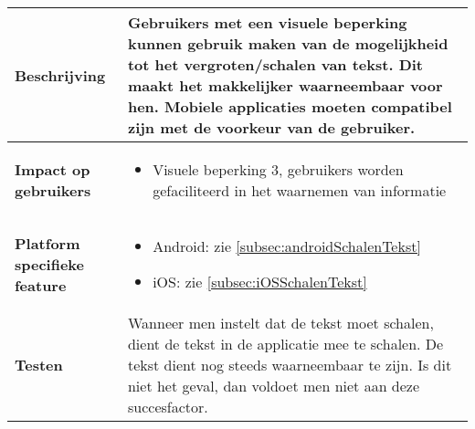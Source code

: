 \begin{table}[H]
\begin{tabular}{|l|p{12cm}|}
        \hline
        \textbf{Beschrijving}                 & Gebruikers met een visuele beperking kunnen gebruik maken van de mogelijkheid tot het vergroten/schalen van tekst. Dit maakt het makkelijker waarneembaar voor hen. Mobiele applicaties moeten compatibel zijn met de voorkeur van de gebruiker.\\ 
        \hline
        \textbf{Impact op gebruikers}         &  
        \begin{itemize}
            \item Visuele beperking 3, gebruikers worden gefaciliteerd in het waarnemen van informatie
        \end{itemize}                                                                                                                                                                                                                                                                                                                                                                                                                    \\ 
        \hline
        \textbf{Platform specifieke feature}  & \begin{itemize}
            \item Android: zie \ref{subsec:androidSchalenTekst}
            \item iOS: zie \ref{subsec:iOSSchalenTekst}
        \end{itemize}                                                                                                                                                                                                                                                                                                                                   \\ 
        \hline
        \textbf{Testen}                       & Wanneer men instelt dat de tekst moet schalen, dient de tekst in de applicatie mee te schalen. De tekst dient nog steeds waarneembaar te zijn. Is dit niet het geval, dan voldoet men niet aan deze succesfactor.                                                                                                                                                                                                                                                                            \\
        \hline
    \end{tabular}
\end{table}



